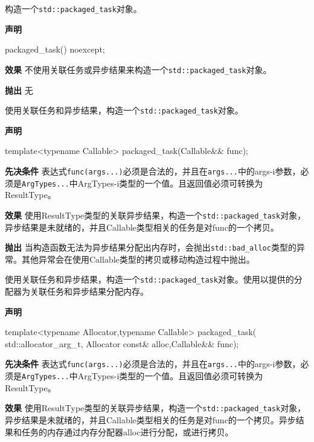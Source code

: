 
构造一个\texttt{std::packaged\_task}对象。

\textbf{声明}

\begin{cpp}
packaged_task() noexcept;
\end{cpp}

\textbf{效果}
不使用关联任务或异步结果来构造一个\texttt{std::packaged\_task}对象。

\textbf{抛出}
无


使用关联任务和异步结果，构造一个\texttt{std::packaged\_task}对象。

\textbf{声明}

\begin{cpp}
template<typename Callable>
packaged_task(Callable&& func);
\end{cpp}

\textbf{先决条件}
表达式\texttt{func(args...)}必须是合法的，并且在\texttt{args...}中的args-i参数，必须是\texttt{ArgTypes...}中ArgTypes-i类型的一个值。且返回值必须可转换为ResultType。

\textbf{效果}
使用ResultType类型的关联异步结果，构造一个\texttt{std::packaged\_task}对象，异步结果是未就绪的，并且Callable类型相关的任务是对func的一个拷贝。

\textbf{抛出}
当构造函数无法为异步结果分配出内存时，会抛出\texttt{std::bad\_alloc}类型的异常。其他异常会在使用Callable类型的拷贝或移动构造过程中抛出。


使用关联任务和异步结果，构造一个\texttt{std::packaged\_task}对象。使用以提供的分配器为关联任务和异步结果分配内存。

\textbf{声明}

\begin{cpp}
template<typename Allocator,typename Callable>
packaged_task(
    std::allocator_arg_t, Allocator const& alloc,Callable&& func);
\end{cpp}

\textbf{先决条件}
表达式\texttt{func(args...)}必须是合法的，并且在\texttt{args...}中的args-i参数，必须是\texttt{ArgTypes...}中ArgTypes-i类型的一个值。且返回值必须可转换为ResultType。

\textbf{效果}
使用ResultType类型的关联异步结果，构造一个\texttt{std::packaged\_task}对象，异步结果是未就绪的，并且Callable类型相关的任务是对func的一个拷贝。异步结果和任务的内存通过内存分配器alloc进行分配，或进行拷贝。

